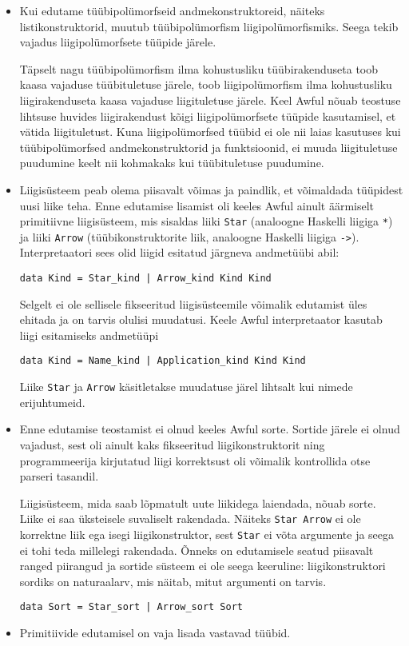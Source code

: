 \documentclass[12pt]{article}
\begin{document}
        \begin{itemize}
          \item
            Kui edutame tüübipolümorfseid andmekonstruktoreid, näiteks listikonstruktorid, muutub tüübipolümorfism liigipolümorfismiks. Seega tekib vajadus liigipolümorfsete tüüpide järele.

            Täpselt nagu tüübipolümorfism ilma kohustusliku tüübirakenduseta toob kaasa vajaduse tüübituletuse järele, toob liigipolümorfism ilma kohustusliku liigirakenduseta kaasa vajaduse liigituletuse järele. Keel Awful nõuab teostuse lihtsuse huvides liigirakendust kõigi liigipolümorfsete tüüpide kasutamisel, et vätida liigituletust. Kuna liigipolümorfsed tüübid ei ole nii laias kasutuses kui tüübipolümorfsed andmekonstruktorid ja funktsioonid, ei muuda liigituletuse puudumine keelt nii kohmakaks kui tüübituletuse puudumine.
          \item
            Liigisüsteem peab olema piisavalt võimas ja paindlik, et võimaldada tüüpidest uusi liike teha. Enne edutamise lisamist oli keeles Awful ainult äärmiselt primitiivne liigisüsteem, mis sisaldas liiki \verb!Star! (analoogne Haskelli liigiga \verb!*!) ja liiki \verb!Arrow! (tüübikonstruktorite liik, analoogne Haskelli liigiga \verb!->!). Interpretaatori sees olid liigid esitatud järgneva andmetüübi abil:

            \begin{verbatim}data Kind = Star_kind | Arrow_kind Kind Kind\end{verbatim}

            Selgelt ei ole sellisele fikseeritud liigisüsteemile võimalik edutamist üles ehitada ja on tarvis olulisi muudatusi. Keele Awful interpretaator kasutab liigi esitamiseks andmetüüpi

            \begin{verbatim}data Kind = Name_kind | Application_kind Kind Kind\end{verbatim}

            Liike \verb!Star! ja \verb!Arrow! käsitletakse muudatuse järel lihtsalt kui nimede erijuhtumeid.
          \item
            Enne edutamise teostamist ei olnud keeles Awful sorte. Sortide järele ei olnud vajadust, sest oli ainult kaks fikseeritud liigikonstruktorit ning programmeerija kirjutatud liigi korrektsust oli võimalik kontrollida otse parseri tasandil.

            Liigisüsteem, mida saab lõpmatult uute liikidega laiendada, nõuab sorte. Liike ei saa üksteisele suvaliselt rakendada. Näiteks \verb!Star Arrow! ei ole korrektne liik ega isegi liigikonstruktor, sest \verb!Star! ei võta argumente ja seega ei tohi teda millelegi rakendada. Õnneks on edutamisele seatud piisavalt ranged piirangud ja sortide süsteem ei ole seega keeruline: liigikonstruktori sordiks on naturaalarv, mis näitab, mitut argumenti on tarvis.

            \begin{verbatim}data Sort = Star_sort | Arrow_sort Sort\end{verbatim}
          \item
            Primitiivide edutamisel on vaja lisada vastavad tüübid.
        \end{itemize}
\end{document}
